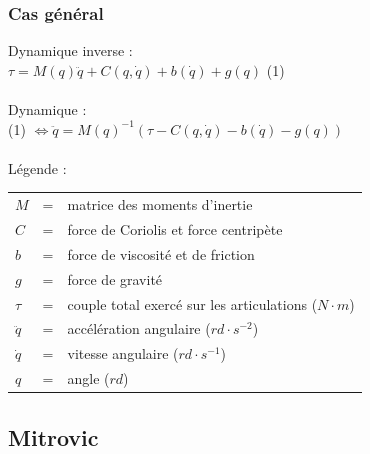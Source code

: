 \documentclass{beamer}
\begin{document}
\begin{frame}
\frametitle{Cas général}
Dynamique inverse : \\
$\tau = M(q)\ddot{q} + C(q, \dot{q}) + b(\dot{q}) + g(q) $ (1)\\
~\\
Dynamique :\\
(1) $\Leftrightarrow \ddot{q} = M(q)^{-1} (\tau - C(q, \dot{q}) - b(\dot{q}) - g(q)) $ \\
~\\
Légende : \\
\begin{tabular}{lcl}
    $M$      & = & matrice des moments d'inertie \\ %
    $C$      & = & force de Coriolis et force centripète \\
    $b$      & = & force de viscosité et de friction \\ %
    $g$      & = & force de gravité \\
    $\tau$   & = & couple total exercé sur les articulations ($N \cdot m$) \\
    $\ddot{q}$ & = & accélération angulaire ($rd \cdot s^{-2}$) \\
    $\dot{q}$ & = & vitesse angulaire ($rd \cdot s^{-1}$) \\
    $q$ & = & angle ($rd$) \\
\end{tabular}
\end{frame}


\subsection{Mitrovic}
\end{document}
